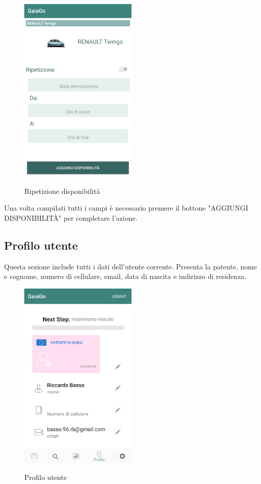  \begin{figure}[H] 
	\centering 
	\includegraphics[width=0.5\textwidth]{res/images/aggiungi_disponibilita2.png}\\
	\caption{Ripetizione disponibilità}
	\label{disponibilità2}
\end{figure}
Una volta compilati tutti i campi è necessario premere il bottone "AGGIUNGI DISPONIBILITÀ" per completare l'azione.
\pagebreak

\subsection{Profilo utente}
Questa sezione include tutti i dati dell'utente corrente. Presenta la patente, nome e cognome, numero di cellulare, email, data di nascita e indirizzo di residenza.
 \begin{figure}[H] 
	\centering 
	\includegraphics[width=0.5\textwidth]{res/images/profilo_utente.png}\\
	\caption{Profilo utente}
	\label{profilo}
\end{figure}
\pagebreak

